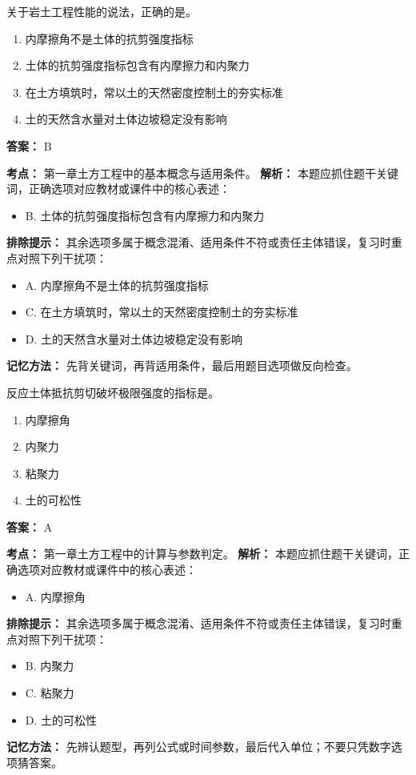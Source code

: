 \documentclass[UTF8,fontset=fandol,11pt]{ctexart}
\begin{document}
\begin{quizbox}[title={第 28 题}]
关于岩土工程性能的说法，正确的是。\\
\begin{enumerate}[label=\Alph*.]
\item 内摩擦角不是土体的抗剪强度指标
\item 土体的抗剪强度指标包含有内摩擦力和内聚力
\item 在土方填筑时，常以土的天然密度控制土的夯实标准
\item 土的天然含水量对土体边坡稳定没有影响
\end{enumerate}
\textbf{答案：} B
\vspace{0.25em}
\begin{answerbox}[title={考点解析}]
\textbf{考点：} 第一章土方工程中的基本概念与适用条件。
\textbf{解析：} 本题应抓住题干关键词，正确选项对应教材或课件中的核心表述：
\begin{itemize}
\item B. 土体的抗剪强度指标包含有内摩擦力和内聚力
\end{itemize}
\textbf{排除提示：} 其余选项多属于概念混淆、适用条件不符或责任主体错误，复习时重点对照下列干扰项：
\begin{itemize}
\item A. 内摩擦角不是土体的抗剪强度指标
\item C. 在土方填筑时，常以土的天然密度控制土的夯实标准
\item D. 土的天然含水量对土体边坡稳定没有影响
\end{itemize}
\textbf{记忆方法：} 先背关键词，再背适用条件，最后用题目选项做反向检查。
\end{answerbox}
\end{quizbox}

\begin{quizbox}[title={第 29 题}]
反应土体抵抗剪切破坏极限强度的指标是。\\
\begin{enumerate}[label=\Alph*.]
\item 内摩擦角
\item 内聚力
\item 粘聚力
\item 土的可松性
\end{enumerate}
\textbf{答案：} A
\vspace{0.25em}
\begin{answerbox}[title={考点解析}]
\textbf{考点：} 第一章土方工程中的计算与参数判定。
\textbf{解析：} 本题应抓住题干关键词，正确选项对应教材或课件中的核心表述：
\begin{itemize}
\item A. 内摩擦角
\end{itemize}
\textbf{排除提示：} 其余选项多属于概念混淆、适用条件不符或责任主体错误，复习时重点对照下列干扰项：
\begin{itemize}
\item B. 内聚力
\item C. 粘聚力
\item D. 土的可松性
\end{itemize}
\textbf{记忆方法：} 先辨认题型，再列公式或时间参数，最后代入单位；不要只凭数字选项猜答案。
\end{answerbox}
\end{quizbox}
\end{document}
